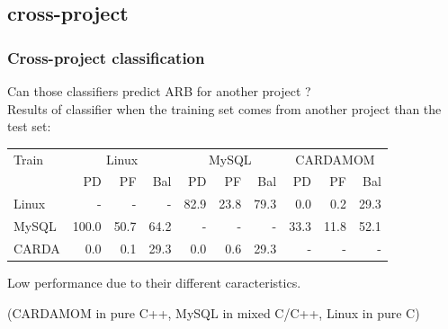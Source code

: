 \documentclass{beamer}
\begin{document}
\subsection{cross-project}
\begin{frame}
 \frametitle{Cross-project classification}
 \alert{Can those classifiers predict ARB for another project ?}\\
 Results of classifier when the training set comes from another project than the test set:
 \begin{center}
 \begin{tabular}{l|r r r|r r r|r r r}
  Train & \multicolumn{3}{c}{Linux} & \multicolumn{3}{c}{MySQL} & \multicolumn{3}{c}{CARDAMOM}\\
  ~ & PD & PF & Bal & PD & PF & Bal & PD & PF & Bal\\
  \hline
  Linux & - & - & - & 82.9 & 23.8 & 79.3 & 0.0 & 0.2 & 29.3\\
  MySQL & 100.0 & 50.7 & 64.2 & - & - & - & 33.3 & 11.8 & 52.1\\
  CARDA & 0.0 & 0.1 & 29.3 & 0.0 & 0.6 & 29.3 & - & - & -\\
  \hline
 \end{tabular}
 \end{center}
 Low performance due to their different caracteristics.
 \begin{center}
  (CARDAMOM in pure C++, MySQL in mixed C/C++, Linux in pure C)
 \end{center}
\end{frame}
\end{document}
